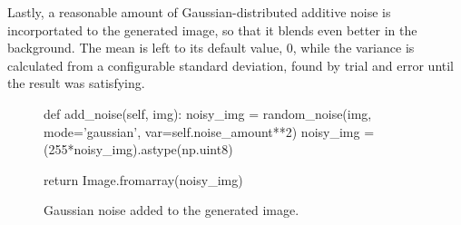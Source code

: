 Lastly, a reasonable amount of Gaussian-distributed additive noise is
incorportated to the generated image, so that it blends even better in the
background. The mean is left to its default value, 0, while the variance is
calculated from a configurable standard deviation, found by trial and error
until the result was satisfying.

\begin{figure}[h!]
    \centering
    \caption{Gaussian noise added to the generated image.}
    \begin{python}
        def add_noise(self, img):
            noisy_img = random_noise(img,
                                     mode='gaussian',
                                     var=self.noise_amount**2)
            noisy_img = (255*noisy_img).astype(np.uint8)

            return Image.fromarray(noisy_img)
    \end{python}
\end{figure}

\newpage
